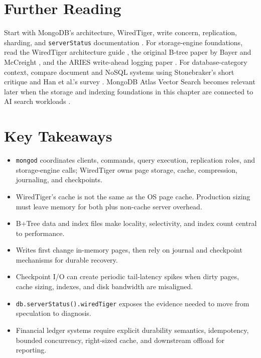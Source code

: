 \section{Further Reading}
Start with MongoDB's architecture, WiredTiger, write concern, replication, sharding, and \texttt{serverStatus} documentation \cite{mongodbArchitectureDocs,mongodbWiredTigerDocs,mongodbWriteConcernDocs,mongodbReplicationDocs,mongodbShardingDocs,mongodbServerStatusDocs}. For storage-engine foundations, read the WiredTiger architecture guide \cite{wiredTigerArch}, the original B-tree paper by Bayer and McCreight \cite{bayer1972organization}, and the ARIES write-ahead logging paper \cite{mohan1992aries}. For database-category context, compare document and NoSQL systems using Stonebraker's short critique and Han et al.'s survey \cite{stonebraker2010sql,han2011survey}. MongoDB Atlas Vector Search becomes relevant later when the storage and indexing foundations in this chapter are connected to AI search workloads \cite{mongodbAtlasVectorSearch}.

\section*{Key Takeaways}
\begin{itemize}
    \item \texttt{mongod} coordinates clients, commands, query execution, replication roles, and storage-engine calls; WiredTiger owns page storage, cache, compression, journaling, and checkpoints.
    \item WiredTiger's cache is not the same as the OS page cache. Production sizing must leave memory for both plus non-cache server overhead.
    \item B+Tree data and index files make locality, selectivity, and index count central to performance.
    \item Writes first change in-memory pages, then rely on journal and checkpoint mechanisms for durable recovery.
    \item Checkpoint I/O can create periodic tail-latency spikes when dirty pages, cache sizing, indexes, and disk bandwidth are misaligned.
    \item \texttt{db.serverStatus().wiredTiger} exposes the evidence needed to move from speculation to diagnosis.
    \item Financial ledger systems require explicit durability semantics, idempotency, bounded concurrency, right-sized cache, and downstream offload for reporting.
\end{itemize}

